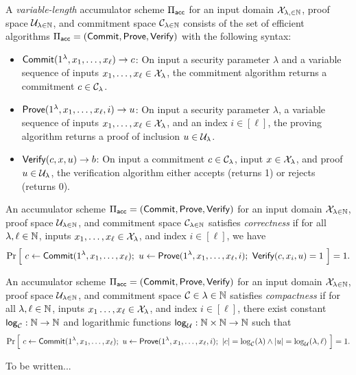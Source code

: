 \begin{definition}[Accumulator]
    A \emph{variable-length} accumulator scheme $\Pi_{\mathsf{acc}}$ for an input domain
    $\mathcal{X}_{\lambda, \in \mathbb{N}}$, proof space $\mathcal{U}_{\lambda \in \mathbb{N}}$, and commitment space
    $\mathcal{C}_{\lambda \in \mathbb{N}}$ consists of the set of efficient algorithms
    $\Pi_{\mathsf{acc}} = (\mathsf{Commit}, \mathsf{Prove},
    \allowbreak \mathsf{Verify})$ with the following syntax:
    \begin{itemize}
        \item $\mathsf{Commit}(1^\lambda, x_1, \ldots, x_\ell) \to c$: On input a
            security parameter $\lambda$ and a variable sequence of inputs
            $x_1, \ldots, x_\ell \in \mathcal{X}_\lambda$, the commitment algorithm
            returns a commitment $c \in \mathcal{C}_\lambda$.

        \item $\mathsf{Prove}(1^\lambda, x_1, \ldots, x_\ell, i) \to u$: On input a
            security parameter $\lambda$, a variable sequence of inputs $x_1,
            \ldots, x_\ell \in \mathcal{X}_\lambda$, and an index $i \in [\ell]$, the
            proving algorithm returns a proof of inclusion $u \in \mathcal{U}_\lambda$.

        \item $\mathsf{Verify}(c, x, u) \to b$: On input a commitment $c \in
            \mathcal{C}_\lambda$, input $x \in \mathcal{X}_\lambda$, and proof $u \in
            \mathcal{U}_\lambda$, the verification algorithm either accepts (returns
            1) or rejects (returns 0).
    \end{itemize}
\end{definition}

\begin{definition}[Correctness]
    An accumulator scheme $\Pi_{\mathsf{acc}} = (\mathsf{Commit}, \mathsf{Prove}, \mathsf{Verify})$ for an input
    domain $\mathcal{X}_{\lambda \in \mathbb{N}}$, proof space $\mathcal{U}_{\lambda \in \mathbb{N}}$, and
    commitment space $\mathcal{C}_{\lambda \in \mathbb{N}}$ satisfies \emph{correctness} if
    for all $\lambda, \ell \in \mathbb{N}$, inputs $x_1, \ldots, x_\ell \in
    \mathcal{X}_\lambda$, and index $i \in [\ell]$, we have
    \[ \Pr \Big[~ c \gets \mathsf{Commit}(1^\lambda, x_1, \ldots, x_\ell) ;~ u \gets
        \mathsf{Prove}(1^\lambda, x_1, \ldots, x_\ell, i) ;~ \mathsf{Verify}(c, x_i, u) = 1
        ~\Big] = 1 .\]
\end{definition}

\newcommand{\polylog}{\ms{polylog}}
\newcommand{\len}{\ms{len}}
\newcommand{\logg}{{\ms{log}}}

\begin{definition}[Compactness]
    An accumulator scheme $\Pi_{\mathsf{acc}} = (\mathsf{Commit}, \mathsf{Prove}, \mathsf{Verify})$ for an input
    domain $\mathcal{X}_{\lambda \in \mathbb{N}}$, proof space $\mathcal{U}_{\lambda \in \mathbb{N}}$, and
    commitment space $\mathcal{C} \in {\lambda \in \mathbb{N}}$ satisfies \emph{compactness}
    if for all $\lambda, \ell \in \mathbb{N}$, inputs $x_1 \ldots, x_\ell \in
    \mathcal{X}_\lambda$, and index $i \in [\ell]$, there exist constant $\logg_\calC:
    \N \to \N$ and logarithmic functions $\logg_{\calU}: \N \times \N \to \N$
    such that
    \[ \Pr \Big[~ c \gets \mathsf{Commit}(1^\lambda, x_1, \ldots, x_\ell) ;~ u \gets
        \mathsf{Prove}(1^\lambda, x_1, \ldots, x_\ell, i) ;~ |c| = \log_{\mathcal{C}}(\lambda) \land |u|
        = \log_{\mathcal{U}}(\lambda, \ell) ~\Big] = 1 .\]
\end{definition}

\begin{definition}[Soundness]
    To be written...
\end{definition}


